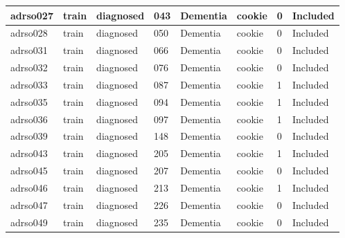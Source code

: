 \begin{center}
\begin{longtable}{|l|l|l|l|l|l|l|l|}
adrso027       & train                 & diagnosed         & 043                & Dementia             & cookie          & 0                & Included      \\ \hline
adrso028       & train                 & diagnosed         & 050                & Dementia             & cookie          & 0                & Included      \\ \hline
adrso031       & train                 & diagnosed         & 066                & Dementia             & cookie          & 0                & Included      \\ \hline
adrso032       & train                 & diagnosed         & 076                & Dementia             & cookie          & 0                & Included      \\ \hline
adrso033       & train                 & diagnosed         & 087                & Dementia             & cookie          & 1                & Included      \\ \hline
adrso035       & train                 & diagnosed         & 094                & Dementia             & cookie          & 1                & Included      \\ \hline
adrso036       & train                 & diagnosed         & 097                & Dementia             & cookie          & 1                & Included      \\ \hline
adrso039       & train                 & diagnosed         & 148                & Dementia             & cookie          & 0                & Included      \\ \hline
adrso043       & train                 & diagnosed         & 205                & Dementia             & cookie          & 1                & Included      \\ \hline
adrso045       & train                 & diagnosed         & 207                & Dementia             & cookie          & 0                & Included      \\ \hline
adrso046       & train                 & diagnosed         & 213                & Dementia             & cookie          & 1                & Included      \\ \hline
adrso047       & train                 & diagnosed         & 226                & Dementia             & cookie          & 0                & Included      \\ \hline
adrso049       & train                 & diagnosed         & 235                & Dementia             & cookie          & 0                & Included      \\ \hline

\end{longtable}
\end{center}
